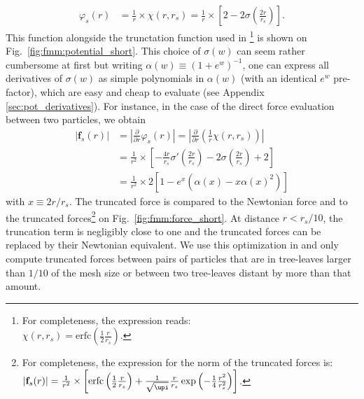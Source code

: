 \begin{align}
  \varphi_s(r) &= \frac{1}{r} \times \chi(r, r_s) = \frac{1}{r}\times\left[2 - 2\sigma\left(\frac{2r}{r_s}\right)\right].%
\end{align}
This function alongside the trunctation function used in
\gadget\footnote{For completeness, the \gadget expression reads:\\
  $\chi(r, r_s) = \mathrm{erfc}(\frac{1}{2}\frac{r}{r_s})$.} is shown
on Fig.~\ref{fig:fmm:potential_short}. This choice of $\sigma(w)$ can
seem rather cumbersome at first but writing
$\alpha(w) \equiv (1+e^w)^{-1}$, one can express all derivatives of
$\sigma(w)$ as simple polynomials in $\alpha(w)$ (with an identical
$e^w$ pre-factor), which are easy and cheap to evaluate (see Appendix
\ref{sec:pot_derivatives}). For instance, in the case of the direct
force evaluation between two particles, we obtain
\begin{align}
  |\mathbf{f}_s(r)| &= \left|\frac{\partial}{\partial r}\varphi_s(r)\right|
                      = \left|\frac{\partial}{\partial r}\left(\frac{1}{r} \chi(r, r_s)\right) \right|\nonumber \\
  &=  \frac{1}{r^2}\times\left[-\frac{4r}{r_s}\sigma'\left(\frac{2r}{r_s}\right) -
    2\sigma\left(\frac{2r}{r_s}\right) + 2\right] \nonumber \\
  &=
    \frac{1}{r^2}\times 2 \left[1 - e^x\left(\alpha(x) - x\alpha(x)^2\right) \right]
\end{align}
with $x\equiv2r/r_s$. The truncated force is compared to the Newtonian
force and to the \gadget truncated forces\footnote{For completeness,
  the \gadget expression for the norm of the truncated forces is:
  $|\mathbf{f}_s(r)| = \frac{1}{r^2} \times
  \left[\mathrm{erfc}\left(\frac{1}{2}\frac{r}{r_s}\right) +
    \frac{1}{\sqrt{\upi}}\frac{r}{r_s}\exp\left(-\frac{1}{4}\frac{r^2}{r_s^2}\right)\right]$.}
on Fig.~\ref{fig:fmm:force_short}. At distance $r<r_s/10$, the
truncation term is negligibly close to one and the truncated forces
can be replaced by their Newtonian equivalent. We use this
optimization in \swift and only compute truncated forces between pairs
of particles that are in tree-leaves larger than $1/10$ of the mesh
size or between
two tree-leaves distant by more than that amount.\\

